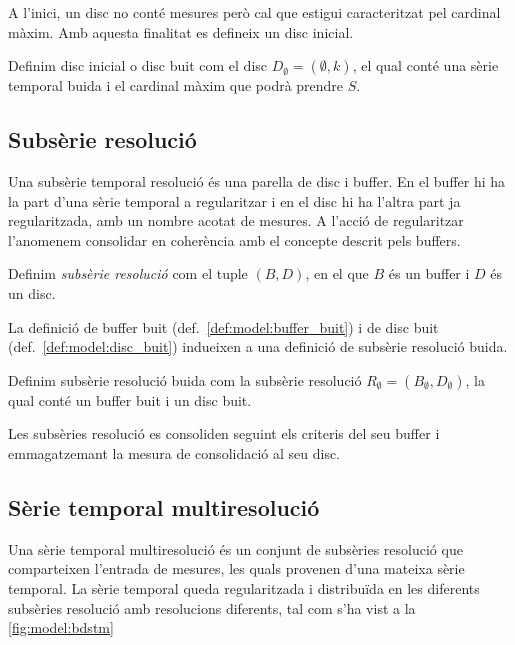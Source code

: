 A l'inici, un disc no conté mesures però cal que estigui caracteritzat
pel cardinal màxim. Amb aquesta finalitat es defineix un disc inicial.

\begin{definition}\label{def:model:disc_buit}
  Definim disc inicial o disc buit com el disc $D_{\emptyset} =
  (\emptyset,k)$, el qual conté una sèrie temporal buida i el cardinal
  màxim que podrà prendre $S$.
\end{definition}




\subsection{Subsèrie resolució}\label{sec:model:subserie-resolucio}

Una subsèrie temporal resolució és una parella de disc i buffer. En el
buffer hi ha la part d'una sèrie temporal a regularitzar i en el disc
hi ha l'altra part ja regularitzada, amb un nombre acotat de
mesures. A l'acció de regularitzar l'anomenem consolidar en coherència
amb el concepte descrit pels buffers.


\begin{definition}
  Definim \emph{subsèrie resolució} com el tuple $(B,D)$, en el que
  $B$ és un buffer i $D$ és un disc.
\end{definition}
 
La definició de buffer buit (def.~\ref{def:model:buffer_buit}) i de
disc buit (def.~\ref{def:model:disc_buit}) indueixen a una definició
de subsèrie resolució buida.
\begin{definition}\label{def:model:subserie_resolucio_buida}
  Definim subsèrie resolució buida com la subsèrie resolució $R_{\emptyset}
  = (B_{\emptyset},D_{\emptyset})$, la qual conté un buffer buit i un
  disc buit.
\end{definition}


Les subsèries resolució es consoliden seguint els criteris del seu
buffer i emmagatzemant la mesura de consolidació al seu disc.




\subsection{Sèrie temporal multiresolució}

Una sèrie temporal multiresolució és un conjunt de subsèries resolució que
comparteixen l'entrada de mesures, les quals provenen d'una mateixa
sèrie temporal. La sèrie temporal queda regularitzada i distribuïda en
les diferents subsèries resolució amb resolucions diferents, tal com s'ha
vist a la \autoref{fig:model:bdstm}


